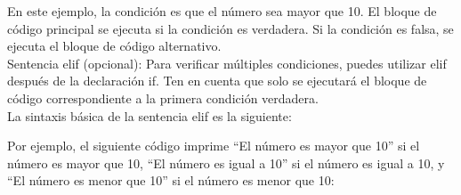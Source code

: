 En este ejemplo, la condición es que el número sea mayor que 10. El bloque de código principal se ejecuta si la condición es verdadera. Si la condición es falsa, se ejecuta el bloque de código alternativo.\\

Sentencia elif (opcional): Para verificar múltiples condiciones, puedes utilizar elif después de la declaración if. Ten en cuenta que solo se ejecutará el bloque de código correspondiente a la primera condición verdadera.\\

La sintaxis básica de la sentencia elif es la siguiente:
\begin{figure}[h]
    \centering
  \end{figure}

Por ejemplo, el siguiente código imprime ``El número es mayor que 10'' si el número es mayor que 10, ``El número es igual a 10'' si el número es igual a 10, y ``El número es menor que 10'' si el número es menor que 10:

\begin{figure}[h]
    \centering
  \end{figure}

